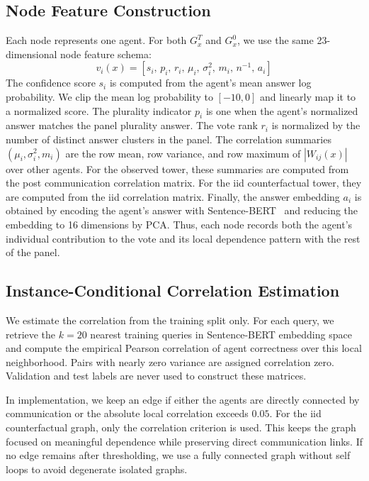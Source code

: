 \subsection{Node Feature Construction}
\label{con:details_of_node_feature}
Each node represents one agent. 
For both $G_x^T$ and $G_x^0$, we use the same 23-dimensional node feature schema:
\begin{equation*}
v_i(x)
=
[
s_i,\,
p_i,\,
r_i,\,
\mu_i,\,
\sigma_i^2,\,
m_i,\,
n^{-1},\,
a_i
]
\end{equation*}
The confidence score $s_i$ is computed from the agent's mean answer log probability. 
We clip the mean log probability to $[-10,0]$ and linearly map it to a normalized score. 
The plurality indicator $p_i$ is one when the agent's normalized answer matches the panel plurality answer. 
The vote rank $r_i$ is normalized by the number of distinct answer clusters in the panel. 
The correlation summaries $(\mu_i,\sigma_i^2,m_i)$ are the row mean, row variance, and row maximum of $|W_{ij}(x)|$ over other agents. 
For the observed tower, these summaries are computed from the post communication correlation matrix. 
For the iid counterfactual tower, they are computed from the iid correlation matrix. 
Finally, the answer embedding $a_i$ is obtained by encoding the agent's answer with Sentence-BERT~\citep{reimers2019sentencebertsentenceembeddingsusing} and reducing the embedding to 16 dimensions by PCA. 
Thus, each node records both the agent's individual contribution to the vote and its local dependence pattern with the rest of the panel.

\subsection{Instance-Conditional Correlation Estimation}
\label{con:corrlation_extimtion}
We estimate the correlation from the training split only. 
For each query, we retrieve the $k=20$ nearest training queries in Sentence-BERT embedding space and compute the empirical Pearson correlation of agent correctness over this local neighborhood. 
Pairs with nearly zero variance are assigned correlation zero. 
Validation and test labels are never used to construct these matrices.

In implementation, we keep an edge if either the agents are directly connected by communication or the absolute local correlation exceeds $0.05$. 
For the iid counterfactual graph, only the correlation criterion is used. 
This keeps the graph focused on meaningful dependence while preserving direct communication links. 
If no edge remains after thresholding, we use a fully connected graph without self loops to avoid degenerate isolated graphs.


